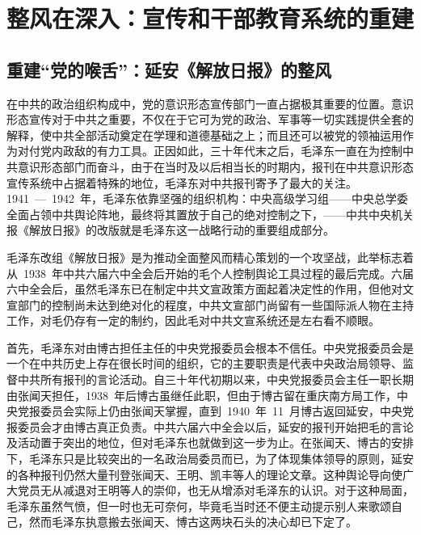 
\chapter{整风在深入：宣传和干部教育系统的重建}

\section{重建“党的喉舌”：延安《解放日报》的整风}

在中共的政治组织构成中，党的意识形态宣传部门一直占据极其重要的位置。意识形态宣传对于中共之重要，不仅在于它可为党的政治、军事等一切实践提供全套的解释，使中共全部活动奠定在学理和道德基础之上；而且还可以被党的领袖运用作为对付党内政敌的有力工具。正因如此，三十年代末之后，毛泽东一直在为控制中共意识形态部门而奋斗，由于在当时及以后相当长的时期内，报刊在中共意识形态宣传系统中占据着特殊的地位，毛泽东对中共报刊寄予了最大的关注。1941~—~1942~年，毛泽东依靠坚强的组织机构：中央高级学习组——中央总学委全面占领中共舆论阵地，最终将其置放于自己的绝对控制之下，——中共中央机关报《解放日报》的改版就是毛泽东这一战略行动的重要组成部分。

毛泽东改组《解放日报》是为推动全面整风而精心策划的一个攻坚战，此举标志着从~1938~年中共六届六中全会后开始的毛个人控制舆论工具过程的最后完成。六届六中全会后，虽然毛泽东已在制定中共文宣政策方面起着决定性的作用，但他对文宣部门的控制尚未达到绝对化的程度，中共文宣部门尚留有一些国际派人物在主持工作，对毛仍存有一定的制约，因此毛对中共文宣系统还是左右看不顺眼。

首先，毛泽东对由博古担任主任的中央党报委员会根本不信任。中央党报委员会是一个在中共历史上存在很长时间的组织，它的主要职责是代表中央政治局领导、监督中共所有报刊的言论活动。自三十年代初期以来，中央党报委员会主任一职长期由张闻天担任，1938~年后博古虽继任此职，但由于博古留在重庆南方局工作，中央党报委员会实际上仍由张闻天掌握，直到~1940~年~11~月博古返回延安，中央党报委员会才由博古真正负责。中共六届六中全会以后，延安的报刊开始把毛的言论及活动置于突出的地位，但对毛泽东也就做到这一步为止。在张闻天、博古的安排下，毛泽东只是比较突出的一名政治局委员而已，为了体现集体领导的原则，延安的各种报刊仍然大量刊登张闻天、王明、凯丰等人的理论文章。这种舆论导向使广大党员无从减退对王明等人的崇仰，也无从增添对毛泽东的认识。对于这种局面，毛泽东虽然气愤，但一时也无可奈何，毕竟毛当时还不便主动提示别人来歌颂自己，然而毛泽东执意搬去张闻天、博古这两块石头的决心却已下定了。

